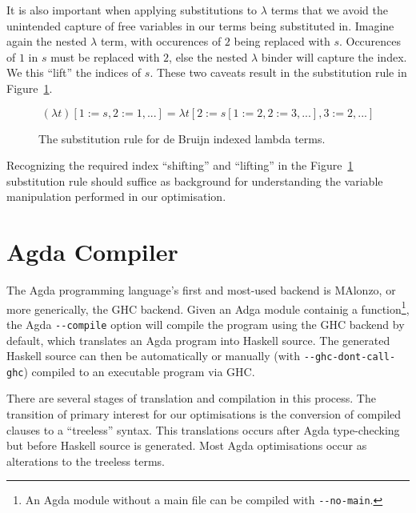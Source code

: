 It is also important when applying substitutions to $\lambda$ terms that we avoid the unintended capture of free variables in our terms being substituted in. Imagine again the nested $\lambda$ term, with occurences of $2$ being replaced with $s$. Occurences of $1$ in $s$ must be replaced with $2$, else the nested $\lambda$ binder will capture the index. We this ``lift'' the indices of $s$. These two caveats result in the substitution rule in Figure~\ref{eq:debruijn_sub}.\cite{abadi1991}

\begin{figure}[h]
\begin{equation*}
(\lambda t)[1 := s, 2 := 1, ...] = \lambda t[2 := s[1 := 2, 2 := 3, ...], 3 := 2, ...]
\end{equation*}
\caption{The substitution rule for de Bruijn indexed lambda terms.}
\label{eq:debruijn_sub}
\end{figure}

Recognizing the required index ``shifting'' and ``lifting'' in the Figure~\ref{eq:debruijn_sub} substitution rule should suffice as background for understanding the variable manipulation performed in our optimisation.

\section{Agda Compiler}
\label{sec:agda_compiler}

The Agda programming language's first and most-used backend is MAlonzo, or more generically, the GHC backend.\cite{benke2007} Given an Adga module containig a  function\footnote{An Agda module without a main file can be compiled with \texttt{-{}-no-main}.}, the Agda \texttt{-{}-compile} option will compile the program using the GHC backend by default, which translates an Agda program into Haskell source. The generated Haskell source can then be automatically or manually (with \texttt{-{}-ghc-dont-call-ghc}) compiled to an executable program via GHC.\cite{agdadocs} %

There are several stages of translation and compilation in this process. The transition of primary interest for our optimisations is the conversion of compiled clauses to a ``treeless'' syntax. This translations occurs after Agda type-checking but before Haskell source is generated. Most Agda optimisations occur as alterations to the treeless terms.

